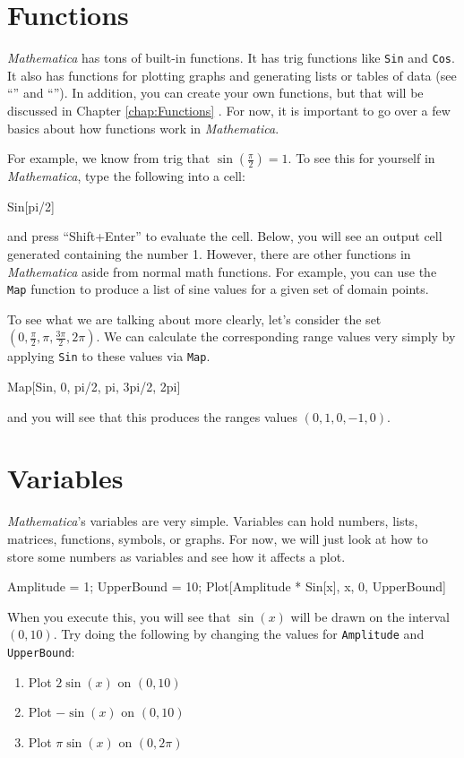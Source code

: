 \section{Functions}
\emph{Mathematica} has tons of built-in functions. It has trig functions like \texttt{Sin} and \texttt{Cos}. It also has functions for plotting graphs and generating lists or tables of data (see ``'' and ``''). In addition, you can create your own functions, but that will be discussed in Chapter \ref{chap:Functions} . For now, it is important to go over a few basics about how functions work in \emph{Mathematica}.

For example, we know from trig that $\sin(\frac{\pi}{2}) = 1$. To see this for yourself in \emph{Mathematica}, type the following into a cell:

\begin{code}
	   Sin[pi/2]
\end{code}
and press ``Shift+Enter'' to evaluate the cell. Below, you will see an output cell generated containing the number 1. However, there are other functions in \emph{Mathematica} aside from normal math functions. For example, you can use the \texttt{Map} function to produce a list of sine values for a given set of domain points. 

To see what we are talking about more clearly, let's consider the set $(0, \frac{\pi}{2}, \pi, \frac{3\pi}{2}, 2\pi)$. We can calculate the corresponding range values very simply by applying \texttt{Sin} to these values via \texttt{Map}.

\begin{code}
	   Map[Sin, {0, pi/2, pi, 3pi/2, 2pi}]
\end{code}
and you will see that this produces the ranges values $(0, 1, 0, -1, 0)$.

\section{Variables}
\emph{Mathematica}'s variables are very simple. Variables can hold numbers, lists, matrices, functions, symbols, or graphs. For now, we will just look at how to store some numbers as variables and see how it affects a plot.

\begin{code}
	   Amplitude = 1;
	   UpperBound = 10;
	   Plot[Amplitude * Sin[x], {x, 0, UpperBound}]
\end{code}

When you execute this, you will see that $\sin(x)$ will be drawn on the interval $(0,10)$. Try doing the following by changing the values for \texttt{Amplitude} and \texttt{UpperBound}:

\begin{enumerate}
	   \item Plot $2\sin(x)$ on $(0,10)$
	   \item Plot $-\sin(x)$ on $(0,10)$
	   \item Plot $\pi\sin(x)$ on $(0, 2 \pi)$
\end{enumerate}
